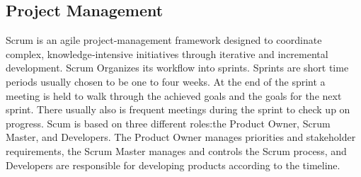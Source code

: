 \subsection{Project Management}
Scrum is an agile project‑management framework designed to coordinate complex, knowledge‑intensive initiatives through iterative and incremental development. Scrum Organizes its workflow into sprints. Sprints are short time periods usually chosen to be one to four weeks. At the end of the sprint a meeting is held to walk through the achieved goals and the goals for the next sprint. There usually also is frequent meetings during the sprint to check up on progress. Scum is based on three different roles:the Product Owner, Scrum Master, and Developers. The Product Owner manages priorities and stakeholder requirements, the Scrum Master manages and controls the Scrum process, and Developers are responsible for developing products according to the timeline.\cite{SchwaberSutherland2020}